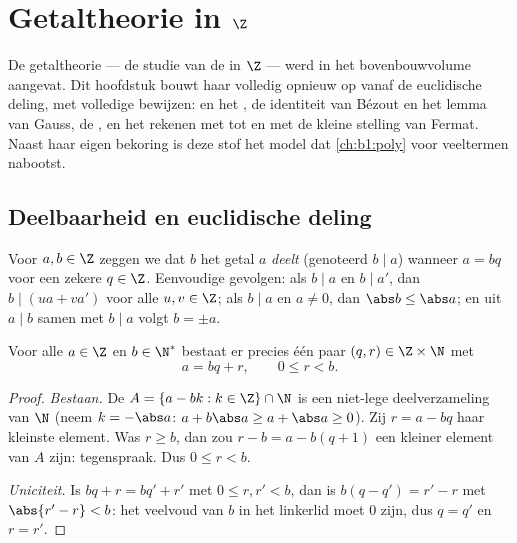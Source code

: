 \chapter{Getaltheorie in $\Z$}\label{ch:b1:arith}

De getaltheorie --- de studie van de  in $\Z$ --- werd in het
bovenbouwvolume aangevat. Dit hoofdstuk bouwt haar volledig opnieuw op
vanaf de euclidische deling, met volledige bewijzen:  en het , de identiteit van Bézout en het lemma
van Gauss, de , en het rekenen met  tot en met
de kleine stelling van Fermat. Naast haar eigen bekoring is deze stof het
model dat \cref{ch:b1:poly} voor veeltermen nabootst.

\section{Deelbaarheid en euclidische deling}

\begin{definition}[Deelbaarheid]\label{def:b1:arith:divides}
Voor $a, b \in \Z$ zeggen we dat $b$ het getal $a$ \emph{deelt}
(genoteerd $b \mid a$) wanneer $a = bq$ voor een
zekere $q \in \Z$. Eenvoudige gevolgen: als $b \mid a$ en $b \mid a'$,
dan $b \mid (ua + va')$ voor alle $u, v \in \Z$; als $b \mid a$ en $a
\neq 0$, dan $\abs b \leq \abs a$; en uit $a \mid b$ samen met $b \mid a$
volgt $b = \pm a$.
\end{definition}

\begin{theorem}\label{thm:b1:arith:division}
Voor alle $a \in \Z$ en $b \in \N^*$ bestaat er precies één paar $(q, r)
\in \Z \times \N$ met
\[
a = bq + r, \qquad 0 \leq r < b .
\]
\end{theorem}

\begin{proof}
\emph{Bestaan.} De  $A = \{a - bk : k \in \Z\} \cap \N$ is een
niet-lege deelverzameling van $\N$ (neem $k = -\abs a$: $a + b\abs a \geq
a + \abs a \geq 0$). Zij $r = a - bq$ haar kleinste element. Was $r \geq
b$, dan zou $r - b = a - b(q+1)$ een kleiner element van $A$ zijn:
tegenspraak. Dus $0 \leq r < b$.

\emph{Uniciteit.} Is $bq + r = bq' + r'$ met $0 \leq r, r' < b$, dan is
$b(q - q') = r' - r$ met $\abs{r' - r} < b$: het veelvoud van $b$ in het
linkerlid moet $0$ zijn, dus $q = q'$ en $r = r'$.
\end{proof}

